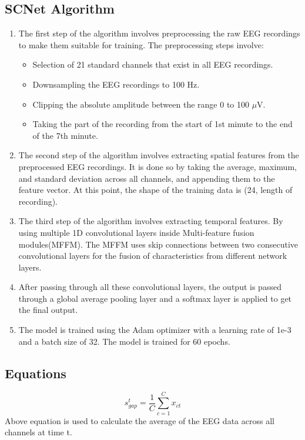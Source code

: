 \documentclass[10pt]{article}
\begin{document}
\subsection{SCNet Algorithm} 
\begin{enumerate}
  \item The first step of the algorithm involves preprocessing the raw EEG recordings to make them suitable for training. The preprocessing steps involve:
  \begin{itemize}
    \item Selection of 21 standard channels that exist in all EEG recordings.
    \item Downsampling the EEG recordings to 100 Hz.
    \item Clipping the absolute amplitude between the range 0 to 100 $\mu$V.
    \item Taking the part of the recording from the start of 1st minute to the end of the 7th minute.
  \end{itemize}
  \item The second step of the algorithm involves extracting spatial features from the preprocessed EEG recordings. It is done so by taking the average, maximum, and standard deviation across all channels, and appending them to the feature vector. At this point, the shape of the training data is (24, length of recording).
  \item The third step of the algorithm involves extracting temporal features. By using multiple 1D convolutional layers inside Multi-feature fusion modules(MFFM). The MFFM uses skip connections between two consecutive convolutional layers for the fusion of characteristics from different network layers.
  \item After passing through all these convolutional layers, the output is passed through a global average pooling layer and a softmax layer is applied to get the final output.
  \item The model is trained using the Adam optimizer with a learning rate of 1e-3 and a batch size of 32. The model is trained for 60 epochs.
\end{enumerate}

\subsection{Equations}
\[ s_{gap}^t = \frac{1}{C} \sum_{c=1}^{C} x_{ct} \]
Above equation is used to calculate the average of the EEG data across all channels at time t.
\end{document}
